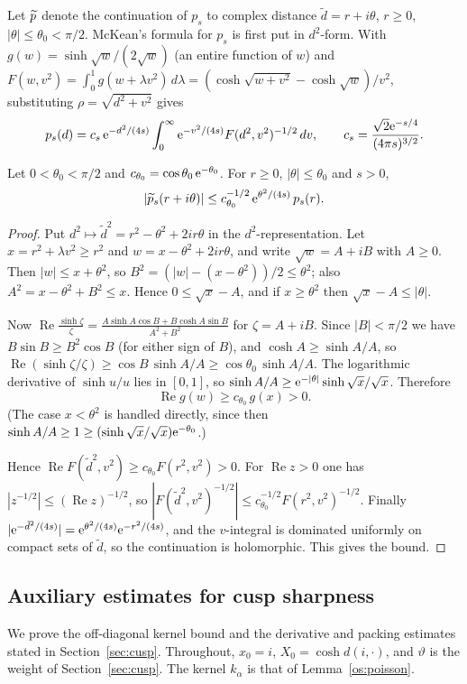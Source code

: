 Let $\widetilde p$ denote the continuation of $p_s$ to complex distance $\tilde d=r+i\theta$, $r\ge0$, $|\theta|\le\theta_0<\pi/2$.
McKean's formula for $p_s$ is first put in $d^2$-form. With $g(w)=\sinh\sqrt w/(2\sqrt w)$ (an entire function of $w$) and
$F(w,v^2)=\int_0^1g(w+\lambda v^2)\,d\lambda=(\cosh\sqrt{w+v^2}-\cosh\sqrt w)/v^2$, substituting $\rho=\sqrt{d^2+v^2}$ gives
\[
p_s(d)=c_s\,\mathrm{e}^{-d^2/(4s)}\int_0^\infty \mathrm{e}^{-v^2/(4s)}F(d^2,v^2)^{-1/2}\,dv,\qquad c_s=\frac{\sqrt2\mathrm{e}^{-s/4}}{(4\pi s)^{3/2}}.
\]

\begin{lemma}\label{os:hk}
Let $0<\theta_0<\pi/2$ and $c_{\theta_0}=\cos\theta_0\,\mathrm{e}^{-\theta_0}$. For $r\ge0$, $|\theta|\le\theta_0$ and $s>0$,
\[
|\widetilde p_s(r+i\theta)|\le c_{\theta_0}^{-1/2}\,\mathrm{e}^{\theta^2/(4s)}\,p_s(r).
\]
\end{lemma}
\begin{proof}
Put $d^2\mapsto\tilde d^2=r^2-\theta^2+2ir\theta$ in the $d^2$-representation. Let $x=r^2+\lambda v^2\ge r^2$ and $w=x-\theta^2+2ir\theta$,
and write $\sqrt w=A+iB$ with $A\ge0$. Then $|w|\le x+\theta^2$, so $B^2=(|w|-(x-\theta^2))/2\le\theta^2$; also $A^2=x-\theta^2+B^2\le x$.
Hence $0\le\sqrt x-A$, and if $x\ge\theta^2$ then $\sqrt x-A\le|\theta|$.

Now $\operatorname{Re}\frac{\sinh\zeta}{\zeta}=\frac{A\sinh A\cos B+B\cosh A\sin B}{A^2+B^2}$ for $\zeta=A+iB$. Since $|B|<\pi/2$ we have
$B\sin B\ge B^2\cos B$ (for either sign of $B$), and $\cosh A\ge\sinh A/A$, so $\operatorname{Re}(\sinh\zeta/\zeta)\ge\cos B\,\sinh A/A\ge\cos\theta_0\,\sinh A/A$. The
logarithmic derivative of $\sinh u/u$ lies in $[0,1]$, so $\sinh A/A\ge \mathrm{e}^{-|\theta|}\sinh\sqrt x/\sqrt x$. Therefore
\[
\operatorname{Re}g(w)\ge c_{\theta_0}\,g(x)>0.
\]
(The case $x<\theta^2$ is handled directly, since then $\sinh A/A\ge1\ge(\sinh\sqrt x/\sqrt x)\mathrm{e}^{-\theta_0}$.)

Hence $\operatorname{Re}F(\tilde d^2,v^2)\ge c_{\theta_0}F(r^2,v^2)>0$. For $\operatorname{Re}z>0$ one has $|z^{-1/2}|\le(\operatorname{Re}z)^{-1/2}$, so
$|F(\tilde d^2,v^2)^{-1/2}|\le c_{\theta_0}^{-1/2}F(r^2,v^2)^{-1/2}$. Finally
$|\mathrm{e}^{-\tilde d^2/(4s)}|=\mathrm{e}^{\theta^2/(4s)}\mathrm{e}^{-r^2/(4s)}$, and the $v$-integral is dominated uniformly on compact sets of $\tilde d$, so the continuation is
holomorphic. This gives the bound.
\end{proof}

\subsection{Auxiliary estimates for cusp sharpness}\label{app:cusp-aux}
We prove the off-diagonal kernel bound and the derivative and packing estimates stated in
Section~\ref{sec:cusp}. Throughout, $x_0=i$, $X_0=\cosh d(i,\cdot)$, and $\vartheta$ is the weight of
Section~\ref{sec:cusp}. The kernel $k_\alpha$ is that of
Lemma~\ref{os:poisson}.


